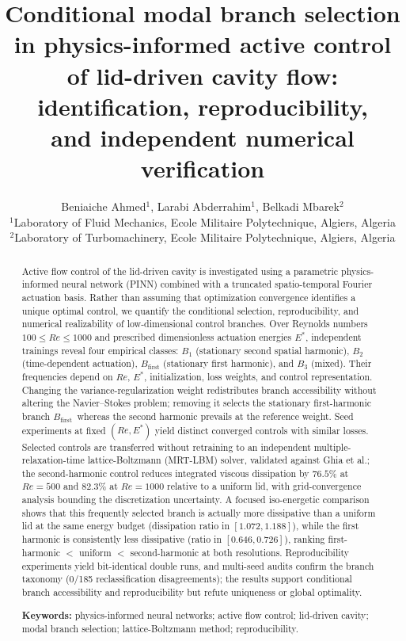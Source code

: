 \documentclass[a4paper,11pt]{article}
\title{\textbf{Conditional modal branch selection in physics-informed active control\\
of lid-driven cavity flow: identification, reproducibility,\\
and independent numerical verification}}
\author{Beniaiche Ahmed\(^{1}\), Larabi Abderrahim\(^{1}\), Belkadi Mbarek\(^{2}\) \\[4pt]
\(^{1}\)Laboratory of Fluid Mechanics, Ecole Militaire Polytechnique, Algiers, Algeria \\
\(^{2}\)Laboratory of Turbomachinery, Ecole Militaire Polytechnique, Algiers, Algeria}
\date{}
\begin{document}
\maketitle

\begin{abstract}
Active flow control of the lid-driven cavity is investigated using a parametric
physics-informed neural network (PINN) combined with a truncated spatio-temporal
Fourier actuation basis. Rather than assuming that optimization convergence
identifies a unique optimal control, we quantify the conditional selection,
reproducibility, and numerical realizability of low-dimensional control branches.
Over Reynolds numbers \(100\le Re\le 1000\) and prescribed dimensionless actuation
energies \(E^*\), independent trainings reveal four empirical classes: \(B_1\)
(stationary second spatial harmonic), \(B_2\) (time-dependent actuation),
\(B_{\mathrm{first}}\) (stationary first harmonic), and \(B_3\) (mixed). Their
frequencies depend on \(Re\), \(E^*\), initialization, loss
weights, and control representation. Changing the variance-regularization weight
redistributes branch accessibility without altering the Navier--Stokes problem;
removing it selects the stationary first-harmonic branch \(B_{\mathrm{first}}\)\,
whereas the second harmonic prevails at the reference weight. Seed experiments at
fixed \((Re,E^*)\) yield distinct converged controls with
similar losses. Selected controls are transferred without retraining to an
independent multiple-relaxation-time lattice-Boltzmann (MRT-LBM) solver, validated
against Ghia et al.; the second-harmonic control reduces integrated viscous
dissipation by \(76.5\%\) at \(Re=500\) and \(82.3\%\) at \(Re=1000\) relative to a
uniform lid, with grid-convergence analysis bounding the discretization
uncertainty. A focused iso-energetic comparison shows that this frequently
selected branch is actually more dissipative than a uniform lid at the same energy
budget (dissipation ratio in \([1.072,1.188]\)), while the first harmonic is
consistently less dissipative (ratio in \([0.646,0.726]\)), ranking first-harmonic
$<$ uniform $<$ second-harmonic at both resolutions. Reproducibility experiments
yield bit-identical double runs, and multi-seed audits confirm the branch taxonomy
(0/185 reclassification disagreements); the results support conditional branch
accessibility and reproducibility but refute uniqueness or global optimality.

\medskip\noindent\textbf{Keywords:} physics-informed neural networks; active flow
control; lid-driven cavity; modal branch selection; lattice-Boltzmann method;
reproducibility.
\end{abstract}
\end{document}
